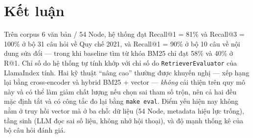 \section{Kết luận}

Trên corpus 6 văn bản / 54 Node, hệ thống đạt Recall@1 = 81\% và Recall@3 = 100\% ở bộ 31 câu hỏi về
Quy chế 2021, và Recall@1 = 90\% ở bộ 10 câu về nội dung sửa đổi --- trong khi baseline tìm từ khóa
BM25 chỉ đạt 58\% và 40\% ở R@1. Chỉ số do hệ thống tự tính khớp với chỉ số do
\texttt{RetrieverEvaluator} của LlamaIndex tính. Hai kỹ thuật ``nâng cao'' thường được khuyến nghị
--- xếp hạng lại bằng cross-encoder và hybrid BM25 + vector --- \emph{không} cải thiện trên quy mô
này và có thể làm giảm chất lượng nếu chọn sai tham số trộn, nên cả hai đều mặc định tắt và có công
tắc đo lại bằng \texttt{make eval}. Điểm yếu hiện nay không nằm ở truy hồi vector mà ở ba chỗ: dữ
liệu (54 Node, metadata hiệu lực trống), tầng sinh (LLM đọc sai số liệu, không nhớ hội thoại), và
độ mạnh thống kê của bộ câu hỏi đánh giá.
